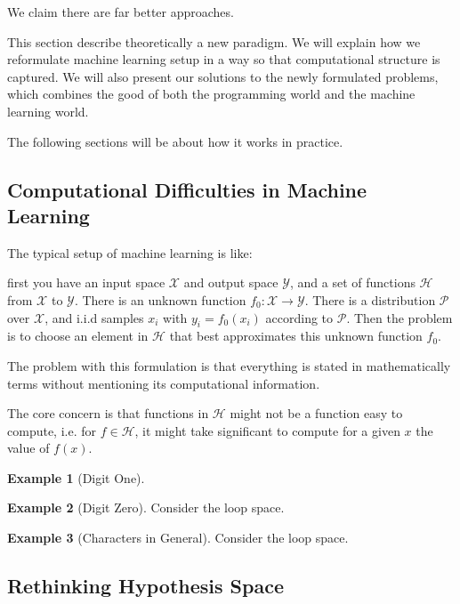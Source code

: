 \documentclass[11pt, oneside]{article}   	%
\theoremstyle{definition}
\newtheorem*{example}{Example}
\begin{document}
We claim there are far better approaches.

This section describe theoretically a new paradigm.
We will explain how we reformulate machine learning setup in a way so that computational structure is captured.
We will also present our solutions to the newly formulated problems, which combines the good of both the programming world and the machine learning world.

The following sections will be about how it works in practice.

\subsection{Computational Difficulties in Machine Learning}

The typical setup of machine learning is like:

first you have an input space $\mathcal{X}$ and output space $\mathcal{Y}$, and a set of functions $\mathcal{H}$ from $\mathcal{X}$ to $\mathcal{Y}$.
There is an unknown function $f_0:\mathcal{X}\to \mathcal{Y}$.
There is a distribution $\mathcal{P}$ over $\mathcal{X}$, and i.i.d samples $x_i$ with $y_i=f_0(x_i)$ according to $\mathcal{P}$.
Then the problem is to choose an element in  $\mathcal{H}$ that best approximates this unknown function  $f_0$.

The problem with this formulation is that everything is stated in mathematically terms without mentioning its computational information.

The core concern is that functions in $\mathcal{H}$ might not be a function easy to compute, i.e. for $f\in \mathcal{H}$,
 it might take significant to compute for a given $x$ the value of $f(x)$.

\begin{example}[Digit One]
\end{example}

\begin{example}[Digit Zero]
	Consider the loop space.
\end{example}

\begin{example}[Characters in General]
	Consider the loop space.
\end{example}

\subsection{Rethinking Hypothesis Space}
\end{document}
